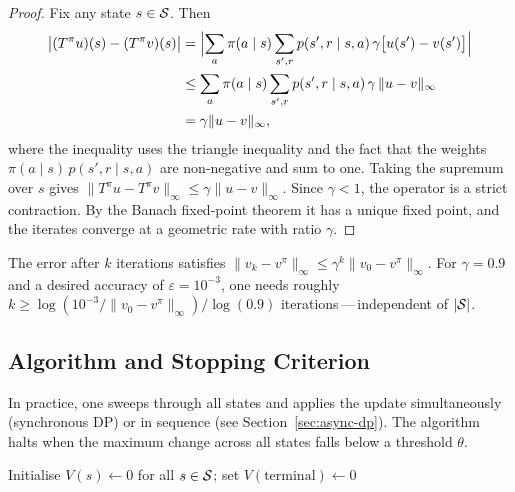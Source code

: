 \begin{proof}
Fix any state $s \in \mathcal{S}$.  Then
\begin{align*}
\bigl|(T^\pi u)(s) - (T^\pi v)(s)\bigr|
&= \Bigl|\sum_a \pi(a \mid s) \sum_{s',r} p(s',r \mid s,a)\,\gamma\bigl[u(s') - v(s')\bigr]\Bigr| \\
&\le \sum_a \pi(a \mid s) \sum_{s',r} p(s',r \mid s,a)\,\gamma\,\|u - v\|_\infty \\
&= \gamma \|u - v\|_\infty,
\end{align*}
where the inequality uses the triangle inequality and the fact that the weights $\pi(a \mid s)\,p(s',r \mid s,a)$ are non-negative and sum to one.  Taking the supremum over $s$ gives $\|T^\pi u - T^\pi v\|_\infty \le \gamma\|u-v\|_\infty$.  Since $\gamma < 1$, the operator is a strict contraction.  By the Banach fixed-point theorem it has a unique fixed point, and the iterates converge at a geometric rate with ratio $\gamma$.
\end{proof}

\begin{remark}
The error after $k$ iterations satisfies $\|v_k - v^\pi\|_\infty \le \gamma^k \|v_0 - v^\pi\|_\infty$.  For $\gamma = 0.9$ and a desired accuracy of $\varepsilon = 10^{-3}$, one needs roughly $k \ge \log(10^{-3}/\|v_0 - v^\pi\|_\infty)/\log(0.9)$ iterations\,---\,independent of $|\mathcal{S}|$.
\end{remark}

\subsection*{Algorithm and Stopping Criterion}

In practice, one sweeps through all states and applies the update simultaneously (synchronous DP) or in sequence (see Section~\ref{sec:async-dp}).  The algorithm halts when the maximum change across all states falls below a threshold $\theta$.

\begin{algorithm}[ht]
\caption{Iterative Policy Evaluation}
\label{alg:policy-eval}
Initialise $V(s) \leftarrow 0$ for all $s \in \mathcal{S}$; set $V(\text{terminal}) \leftarrow 0$\;
\end{algorithm}

